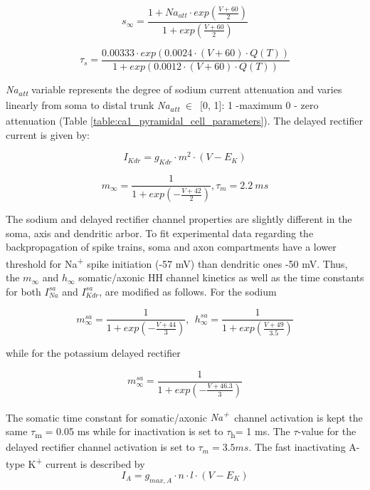 \documentclass[a4paper,12pt]{article}
\begin{document}
\begin{equation}
s_{\infty}=\frac{1+Na_{att}\cdot exp(\frac{V+60}{2})}{1+exp(\frac{V+60}{2})}
\end{equation}


\begin{equation}
\tau_s=\frac{0.00333\cdot  exp(0.0024 \cdot (V+60)\cdot
		Q(T))}{1+exp(0.0012 \cdot (V+60)\cdot Q(T))}
\end{equation}

\textit{Na\textsubscript{att}} variable represents the degree of sodium current
attenuation and varies linearly from soma to distal trunk
\textit{Na\textsubscript{att}} $\in$~[0, 1]: 1 -maximum 0 - zero attenuation (Table \ref{table:ca1_pyramidal_cell_parameters}). The delayed rectifier current is given by:

\begin{equation}
I_{Kdr} = g_{Kdr} \cdot m^2 \cdot (V-E_K)
\end{equation}

\begin{equation}
m_{\infty}=\frac{1}{1+exp(-\frac{V+42}{2})}, \tau_m = 2.2 \ ms
\end{equation}

The sodium and delayed rectifier channel properties are slightly different in the soma, axis and dendritic arbor. To fit
experimental data regarding the backpropagation of spike trains, soma and axon compartments have a lower threshold for
Na\textsuperscript{+} spike initiation (-57 mV) than dendritic ones -50 mV. Thus, the $m_{\infty}$ and $h_{\infty}$
somatic/axonic HH channel kinetics as well as the time constants for both $I_{Na}^{sa}$ and $I_{Kdr}^{sa}$, are modified as follows. For the sodium

\begin{equation}
m_{\infty}^{sa}=\frac {1}{1+exp(-\frac{V+44}{3})} ,\ \ 
h_{\infty}^{sa}=\frac {1}{1+exp(\frac{V+49}{3.5})}
\end{equation}

while for the potassium delayed rectifier

\begin{equation}
m_{\infty}^{sa}=\frac {1}{1+exp(-\frac{V+46.3}{3})}
\end{equation}

The somatic time constant for somatic/axonic \textit{Na}\textit{\textsuperscript{+}}~channel activation is kept the
same $\tau$\textsubscript{m} = 0.05 ms while for inactivation is set to $\tau$\textsubscript{h}= 1 ms. The $\tau$-value for the delayed rectifier channel activation is set to $\tau_{m}= 3.5 ms$.
The fast inactivating A-type K\textsuperscript{+ }current is described by
\begin{equation}
I_A = g_{max, A} \cdot n \cdot l \cdot (V - E_K)
\end{equation}
\end{document}
